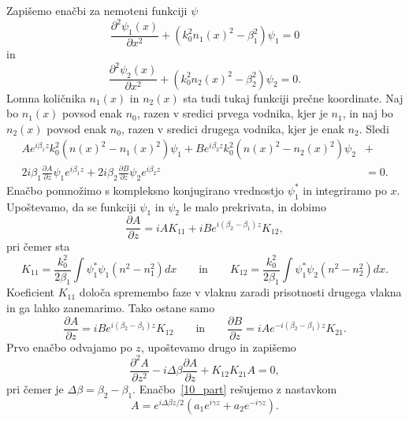 Zapišemo enačbi za nemoteni funkciji $\psi$
\begin{equation}
\frac{\partial^2\psi_1(x)}{\partial x^2} + \left(k_0^2n_1(x)^2-\beta_1^2\right) \psi_1 =0
\end{equation}
in
\begin{equation}
 \frac{\partial^2\psi_2(x)}{\partial x^2} + \left(k_0^2n_2(x)^2-\beta_2^2\right) \psi_2 =0.
\end{equation}
Lomna količnika $n_1(x)$ in $n_2(x)$ sta tudi tukaj funkciji prečne koordinate. Naj bo $n_1(x)$  
povsod enak $n_0$, razen v sredici prvega vodnika, kjer je $n_1$, in naj bo 
$n_2(x)$ povsod enak $n_0$, razen v sredici drugega vodnika, kjer je enak $n_2$. Sledi
\begin{align}
A e^{i \beta_1 z}k_0^2\left(n(x)^2 -n_1(x)^2\right)\psi_1 
+ 
B e^{i \beta_2 z}k_0^2\left(n(x)^2 -n_2(x)^2\right)\psi_2 &+ \nonumber\\
2 i \beta_1 \frac{\partial A}{\partial z} \psi_1 e^{i \beta_1 z}
+
2 i \beta_2 \frac{\partial B}{\partial z} \psi_2 e^{i \beta_2 z} &= 0.
\end{align}
Enačbo pomnožimo s kompleksno konjugirano vrednostjo $\psi_1^*$ in integriramo po $x$.
Upoštevamo, da se funkciji $\psi_1$ in $\psi_2$ le malo prekrivata, in dobimo
\begin{equation}
\frac{\partial A}{\partial z} = i A K_{11}+i B e^{i(\beta_2-\beta_1)z} K_{12},
\end{equation}
pri čemer sta
\begin{equation}
K_{11}= \frac{k_0^2}{2 \beta_1}\int\psi_1^*\psi_1 (n^2-n_1^2)dx \qquad \mathrm{in} \qquad 
K_{12}= \frac{k_0^2}{2 \beta_1}\int\psi_1^*\psi_2 (n^2-n_2^2)dx.
\end{equation}
Koeficient $K_{11}$ določa spremembo faze v vlaknu zaradi prisotnosti 
drugega vlakna in ga lahko zanemarimo. Tako ostane samo 
\begin{equation}
\frac{\partial A}{\partial z} = i B e^{i(\beta_2-\beta_1)z} K_{12} \qquad \mathrm{in}
\qquad \frac{\partial B}{\partial z} = i A e^{-i(\beta_2-\beta_1)z} K_{21}.
\label{10_B}
\end{equation}
Prvo enačbo odvajamo po $z$, upoštevamo drugo in zapišemo
\begin{equation}
\frac{\partial^2 A}{\partial z^2}-i \Delta \beta \frac{\partial A}{\partial z} + K_{12}K_{21}A = 0,
\label{10_part}
\end{equation}
pri čemer je $\Delta \beta = \beta_2 - \beta_1$. Enačbo~\ref{10_part} rešujemo z nastavkom
\begin{equation}
A = e^{i \Delta \beta z/2}\left( a_1 e^{i \gamma z} + a_2 e^{-i \gamma z}\right)\!.
\label{10_nastavek}
\end{equation}
